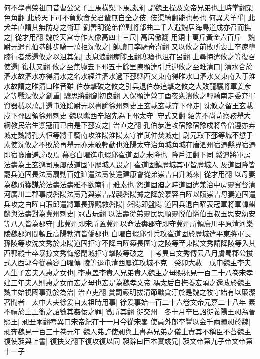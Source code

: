 何不學書榮祖曰昔曹公父子上馬橫槊下馬談詠|{
	謂魏王操及文帝兄弟也上時掌翻槊色角翻}
此於天下可不負飲食矣君輩無自全之伎|{
	伎渠綺翻能也藝也}
何異犬羊乎|{
	此犬羊直謂其無防身之術耳}
劉善明從弟僧副將部曲二千人避魏居海島道成亦召而撫之|{
	從才用翻}
魏於天宫寺作大像高四十三尺|{
	高居傲翻}
用銅十萬斤黃金六百斤　魏尉元遣孔伯恭帥步騎一萬拒沈攸之|{
	帥讀曰率騎奇寄翻}
又以攸之前敗所喪士卒瘃墮膝行者悉還攸之以沮其氣|{
	喪息浪翻瘃陟玉翻寒瘡也沮在呂翻}
上尋悔遣攸之等復召使還|{
	復扶又翻}
攸之至焦墟去下邳五十餘里陳顯逹引兵迎攸之至睢清口|{
	清水合於泗水故泗水亦得清水之名水經注泗水過下邳縣西又東南得睢水口泗水又東南入于淮水故謂之睢清口睢音雖}
伯恭擊破之攸之引兵退伯恭追擊之攸之大敗龍驤將軍姜彦之等戰没攸之創重|{
	驤思將翻創初良翻}
入保顯逹營丁酉夜衆潰攸之輕騎南走委弃軍資器械以萬計還屯淮隂尉元以書諭徐州刺史王玄載玄載弃下邳走|{
	沈攸之留王玄載戍下邳因領徐州刺史}
魏以隴西辛紹先為下邳太守|{
	守式又翻}
紹先不尚苛察務舉大綱教民治生禦寇而已由是下邳安之|{
	治直之翻}
孔伯恭進攻宿豫宿豫戍將魯僧遵亦弃城走魏將孔大恒等將千騎南攻淮陽淮陽太守崔武仲焚城走|{
	尉元取下邳等城不愆于素使沈攸之不敗於再舉元亦未敢輕動也淮陽太守治角城角城在唐泗州宿遷縣界宿遷即宿豫唐避諱改焉}
慕容白曜進屯瑕邱崔道固之未降也|{
	降戶江翻下同}
綏邉將軍房法壽為王玄邈司馬屢破道固軍歷城人畏之|{
	崔道固鎮歷城其軍皆歷城人}
及道固降皆罷兵道固畏法壽扇動百姓廹遣法壽使還建康會從弟崇吉自升城來|{
	從才用翻}
以母妻為魏所獲謀於法壽法壽雅不欲南行|{
	雅素也}
怨道固廹之時道固遣兼治中房靈賓督清河廣川二郡事戍磐陽法壽乃與崇吉謀襲磐陽據之降於慕容白曜以贖崇吉母妻道固遣兵攻之白曜自瑕邱遣將軍長孫觀救磐陽|{
	磐陽即盤陽}
道固兵退白曜表冠軍將軍韓麒麟與法壽對為冀州刺史|{
	冠古玩翻}
以法壽從弟靈民思順靈悦伯憐伯玉叔玉思安幼安等八人皆為郡守|{
	此冀州即宋所置冀州以命法夀郡守即守冀州所領廣川平原清河樂陵魏郡河間頓丘高陽勃海皆僑郡也}
白曜自瑕邱引兵攻崔道固於歷城遣平東將軍長孫陵等攻沈文秀於東陽道固拒守不降白曜築長圍守之陵等至東陽文秀請降陵等入其西郭縱士卒暴掠文秀悔怒閉城拒守擊陵等破之　|{
	考異曰文秀傳云八月虜蜀郡公拔式入西郭今從慕容白曜傳}
陵等退屯清西屢進攻城不克　癸卯大赦　戊申魏主李夫人生子宏夫人惠之女也|{
	李惠盖李貴人兄弟貴人魏主之母賜死見一百二十八卷宋孝建三年夫人則惠之女而宏之母也宏是為魏孝文帝}
馮太后自撫養宏頃之還政於魏主魏主始視國事勤於為治|{
	治直吏翻}
賞罰嚴明拔清節黜貪汙於是魏之牧守始有以廉潔著聞者　太中大夫徐爰自太祖時用事|{
	徐爰事始一百二十六卷文帝元嘉二十八年}
素不禮於上上銜之詔數其姦佞之罪|{
	數所其翻}
徙交州　冬十月辛巳詔徙義陽王昶為晉熙王|{
	昶丑兩翻考異曰宋帝紀在十一月今從宋畧}
使員外郎李豐以金千兩贖昶於魏|{
	昶奔魏見一百三十卷元年}
魏人弗許使昶與上書為兄弟之儀上責其不稱臣不荅魏主復使昶與上書|{
	復扶又翻下復攻復以同}
昶辭曰臣本實彧兄|{
	昶文帝第九子帝文帝第十一子}
